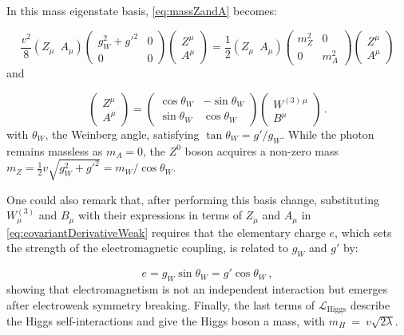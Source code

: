 In this mass eigenstate basis, \cref{eq:massZandA} becomes:

\begin{equation}
    \frac{v^2}{8}\left(Z_\mu \,\,\, A_\mu\right) 
    \begin{pmatrix} g_W^2+g'^2 & 0 \\ 0 & 0 \end{pmatrix}
    \left( \begin{array}{c} Z^\mu \\ A^\mu \end{array} \right) = \frac{1}{2}\left(Z_\mu \,\,\, A_\mu\right) 
    \begin{pmatrix} m_Z^2 & 0 \\ 0 & m_A^2 \end{pmatrix}
    \left( \begin{array}{c} Z^\mu \\ A^\mu \end{array} \right)
\end{equation}
and

\begin{equation}
    \left( \begin{array}{c} Z^\mu \\ A^\mu \end{array} \right) = 
    \begin{pmatrix} \cos \theta_W & -\sin \theta_W \\ \sin \theta_W & \cos \theta_W \end{pmatrix}
    \left( \begin{array}{c} W^{(3) \,\mu} \\ B^\mu \end{array} \right) \, .
\end{equation}
with $\theta_W$, the Weinberg angle, satisfying $\tan\theta_W=g'/g_W$. While the photon remains massless as $m_A=0$, the $Z^0$ boson acquires a non-zero mass $m_Z=\frac{1}{2}v\sqrt{g_W^2+g'^2}=m_W/\cos\theta_W$.

One could also remark that, after performing this basis change, substituting $W_\mu^{(3)}$ and $B_\mu$ with their expressions in terms of $Z_\mu$ and $A_\mu$ in \cref{eq:covariantDerivativeWeak} requires that the elementary charge $e$, which sets the strength of the electromagnetic coupling, is related to $g_W$ and $g'$ by:
  
\begin{equation}
  e = g_W \sin\theta_W = g' \cos\theta_W \, ,
\end{equation}
showing that electromagnetism is not an independent interaction but emerges after electroweak symmetry breaking. Finally, the last terms of $\mathcal{L}_{\mathrm{Higgs}}$ describe the Higgs self-interactions and give the Higgs boson a mass, with $m_H~=~v\sqrt{2\lambda}$.

